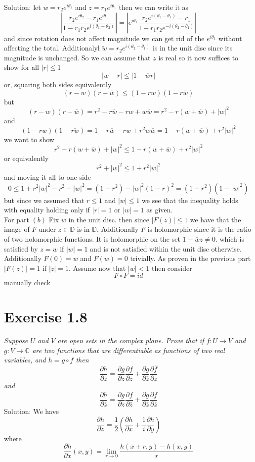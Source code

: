 \documentclass[11pt]{article}
\newcommand{\solution}[1]{{{\textcolor{header}{Solution:} \textcolor{solution}{#1}}}}
\begin{document}
\solution{
    let $w = r_2e^{i\theta_2}$ and $z = r_1e^{i\theta_1}$ then we can write it as
    \[
    \left | \frac{r_2e^{i\theta_2} - r_1e^{i\theta_1}}{1 - r_1r_2e^{i(\theta_1-\theta_2)}} \right | = \left| e^{i\theta_1} \frac{r_2e^{i(\theta_2-\theta_1)} - r_1}{1 - r_1r_2e^{-i(\theta_2-\theta_1)}} \right|
    \] 
    and since rotation does not affect magnitude we can get rid of the $e^{i\theta_1}$ without affecting the total. Additionalyl $\tilde w = r_2e^{i(\theta_2 - \theta_1)}$ is in the unit disc since its magnitude is unchanged. So we can assume that $z$ is real
    so it now suffices to show for all  $|r| \le 1$ 
     \[
    |w-r| \le |1-\overline{w}r|
    \] 
    or, squaring both sides equivalently
    \[
        (r-w)(r-\overline{w}) \le (1-rw)(1-r\overline{w})
    \] 
    but
    \[
        (r-w)(r-\overline{w}) = r^2 - r \overline{w} - rw + w \overline{w} = r^2 - r(w + \overline{w}) + |w|^2
    \] 
    and
    \[
        (1-rw)(1-\overline{rw}) = 1 - r \overline{w} - rw + r^2 w \overline{w} = 1 - r(w + \overline{w}) + r^2 |w|^2
    \] 
    we want to show
    \[
    r^2 - r(w + \overline{w}) + |w|^2 \le 1 - r(w + \overline{w}) + r^2 |w|^2
    \] 
    or equivalently
    \[
    r^2 + |w|^2 \le 1 + r^2|w|^2 
    \] 
    and moving it all to one side
    \[
    0 \le 1 + r^2|w|^2 - r^2 - |w|^2 = (1-r^2) - |w|^2(1-r)^2 = (1-r^2)(1-|w|^2)
    \] 
    but since we assumed that $r \le 1$ and  $|w| \le 1$ we see that the inequality holds with equality holding only if  $|r| = 1$ or  $|w| = 1$ as given.\\
    For part $(b)$ Fix  $w$ in the unit disc. then since  $|F(z)| \le 1$ we have that the image of  $F$ under  $z \in \mathbb{D}$ is in  $\mathbb{D}$.
    Additionally $F$ is holomorphic since it is the ratio of two holomorphic functions. It is holomorphic on the set $1 - \overline{w}z \ne 0$. which is satisfied by $z = w$ if  $|w| =1$ and is not satisfied within the unit disc otherwise.
    Additionally $F(0) = w$ and  $F(w) = 0$ trivially. As proven in the previous part  $|F(z)| = 1$ if  $|z| = 1$. Assume now that  $|w| < 1$ then consider
     \[
    F \circ F = id
    \] 
    manually check
}

\section{Exercise 1.8}
\emph{
    Suppose $U$ and $V$ are open sets in the complex plane. Prove that if $f : U \rightarrow V$ and $g : V \rightarrow \mathbb{C}$
    are two functions that are differentiable as functions of two real variables, and $h = g \circ f$ then
     \[
    \frac{\partial h}{\partial z} = \frac{\partial g}{\partial z} \frac{\partial f}{\partial z} + \frac{\partial g}{\partial \overline{z}} \frac{\partial \overline{f}}{\partial z}
    \] 
    and
    \[
        \frac{\partial h}{\partial \overline{z}} = \frac{\partial g}{\partial z} \frac{\partial f}{\partial \overline{ z}} + \frac{\partial g}{\partial \overline{ z}} \frac{\partial \overline{ f}}{\partial \overline{ z}}
    \] 
}
\solution{
    We have
    \[
        \frac{\partial h}{\partial z} = \frac{1}{2}(\frac{\partial h}{\partial x} + \frac{1}{i}\frac{\partial h}{\partial y})
    \] 
    where
    \[
        \frac{\partial h}{\partial x}(x,y) = \lim_{r\to 0} \frac{h(x+r,y)-h(x,y)}{r}
    \] 
}
\end{document}
